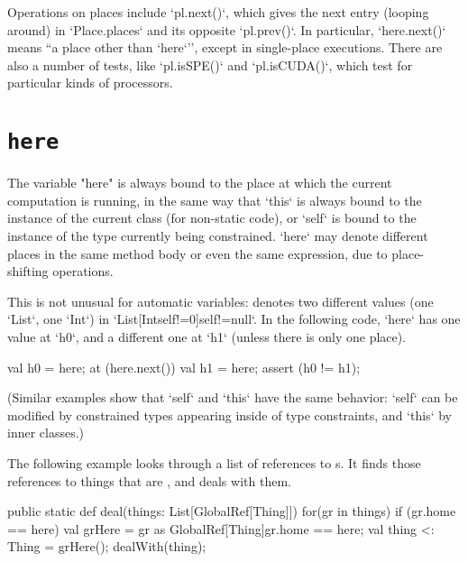 Operations on places include \xcd`pl.next()`, which gives the next entry
(looping around) in \xcd`Place.places` and its opposite \xcd`pl.prev()`. In
particular, \xcd`here.next()` means ``a place other than \xcd`here`'', except
in single-place executions.
There are also a number of tests, like \xcd`pl.isSPE()` and 
\xcd`pl.isCUDA()`, which test for particular kinds of processors.




\section{{\tt here}}\label{Here}

The variable \xcd"here" is always bound to the place at which the current
computation is running, in the same way that \xcd`this` is always bound to the
instance of the current class (for non-static code), or \xcd`self` is bound to
the instance of the type currently being constrained.  
\xcd`here` may denote different places in the same method body or even the
same expression, due to
place-shifting operations.


This is not unusual for automatic variables:   denotes 
two different values (one \xcd`List`, one \xcd`Int`) in
\xcd`List[Int{self!=0}]{self!=null}`. In the following 
code, \xcd`here` has one value at 
\xcd`h0`, and a different one at \xcd`h1` (unless there is only one place).
\begin{xten}
val h0 = here;
at (here.next()) {
  val h1 = here; 
  assert (h0 != h1);
}
\end{xten}
\noindent
(Similar examples show that \xcd`self` and \xcd`this` have the same behavior:
\xcd`self` can be modified by constrained types appearing inside of type
constraints, and \xcd`this` by inner classes.)



The following example looks through a list of references to s.  
It finds those references to things that are , and deals with them.  
\begin{xten}
  public static def deal(things: List[GlobalRef[Thing]]) {
     for(gr in things) {
        if (gr.home == here) {
           val grHere = 
               gr as GlobalRef[Thing]{gr.home == here};
           val thing <: Thing = grHere();
           dealWith(thing);
        }
     }
  }
\end{xten}

